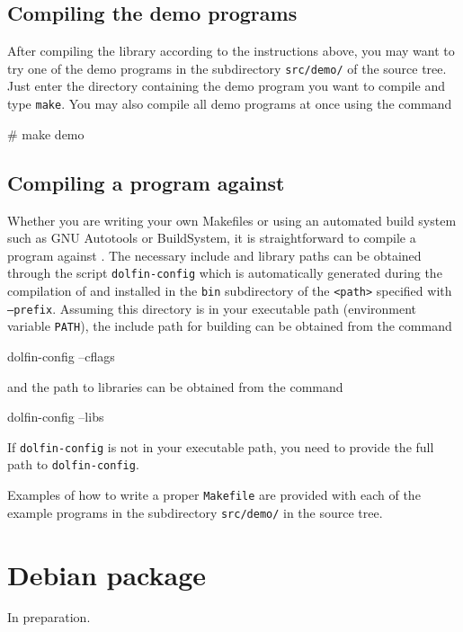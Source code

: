 \subsection{Compiling the demo programs}

After compiling the \dolfin{} library according to the instructions
above, you may want to try one of the demo programs in the
subdirectory \texttt{src/demo/} of the \dolfin{} source tree.
Just enter the directory containing the demo program you want to
compile and type \texttt{make}. You may also compile all demo programs
at once using the command
\begin{code}
  # make demo
\end{code}

\subsection{Compiling a program against \dolfin{}}

Whether you are writing your own Makefiles or using an automated build
system such as GNU Autotools or BuildSystem, it is straightforward to
compile a program against \dolfin{}. The necessary include and library
paths can be obtained through the script \texttt{dolfin-config} which
is automatically generated during the compilation of \dolfin{} and
installed in the \texttt{bin} subdirectory of the \texttt{<path>}
specified with \texttt{--prefix}. Assuming this directory is in your
executable path (environment variable \texttt{PATH}), the include
path for building \dolfin{} can be obtained from the command
\begin{code}
  dolfin-config --cflags
\end{code}
and the path to \dolfin{} libraries can be obtained from the command
\begin{code}
  dolfin-config --libs
\end{code}
If \texttt{dolfin-config} is not in your executable path, you need to
provide the full path to \texttt{dolfin-config}.

Examples of how to write a proper \texttt{Makefile} are provided with
each of the example programs in the subdirectory \texttt{src/demo/} in
the \dolfin{} source tree.

\section{Debian package}

In preparation.
